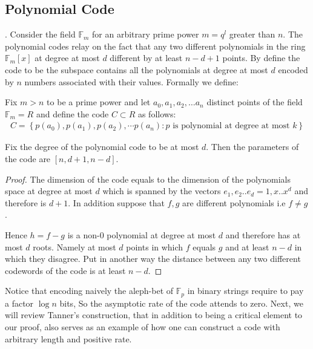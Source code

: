 \subsection{Polynomial Code}. Consider the field $\mathbb{F}_{m}$ for an arbitrary prime power $m=q^{l}$ greater than $n$. The polynomial codes relay on the fact that any two different polynomials in the ring $\mathbb{F}_{m}\left[ x \right]$ at degree at most $d$ different by at least $n - d + 1$ points. By define the code to be the subspace contains all the polynomials at degree at most $d$ encoded by $n$ numbers associated with their values. Formally we define:     
\begin{definition}
  Fix $m > n $ to be a prime power and let $a_{0},a_{1},a_{2},\ldots a_{n}$ distinct points of the field $\mathbb{F}_{m} = R$  and define the code $C \subset R $ as follows:  
  \begin{equation*}
    \begin{split}
      C = \left\{p\left(a_{0}\right),p\left(a_{1}\right),p\left(a_{2}\right),\cdots p\left(a_{n}\right) : p \text{ is polynomial at degree at most } k \right\}
    \end{split}
  \end{equation*}
\end{definition}
\begin{lemma}
  Fix the degree of the polynomial code to be at most $d$. Then the parameters of the code are $[n,d + 1, n - d]$.  
  \label{polycode}
\end{lemma}
\begin{proof}
  The dimension of the code equals to the dimension of the polynomials space at degree at most $d$ which is spanned by the vectors $e_{1}, e_{2} .. e_{d} = 1, x .. x^{d}$ and therefore is $d+1$. In addition suppose that $f,g$ are different polynomials i.e $f\neq g$.

  Hence $h = f-g$ is a non-$0$ polynomial at degree at most $d$ and therefore has at most $d$ roots. Namely at most $d$ points in which $f$ equals $g$ and at least $n-d$ in which they disagree. Put in another way the distance between any two different codewords of the code is at least $n-d$.  
\end{proof}
Notice that encoding naively the aleph-bet of $\mathbb{F}_{p}$ in binary strings require to pay a factor $\log n$ bits, So the asymptotic rate of the code attends to zero.     
Next, we will review Tanner's construction, that in addition to being a critical element to our proof, also serves as an example of how one can construct a code with arbitrary length and positive rate.
